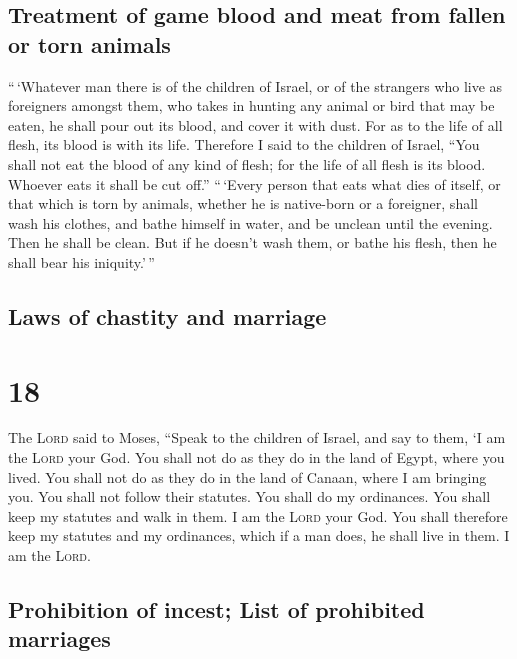 \hypertarget{treatment-of-game-blood-and-meat-from-fallen-or-torn-animals}{%
\subsection{Treatment of game blood and meat from fallen or torn
animals}\label{treatment-of-game-blood-and-meat-from-fallen-or-torn-animals}}

 ``\,`Whatever man there is of the children of Israel, or
of the strangers who live as foreigners amongst them, who takes in
hunting any animal or bird that may be eaten, he shall pour out its
blood, and cover it with dust.  For as to the life of all
flesh, its blood is with its life. Therefore I said to the children of
Israel, ``You shall not eat the blood of any kind of flesh; for the life
of all flesh is its blood. Whoever eats it shall be cut off.''
 ``\,`Every person that eats what dies of itself, or that
which is torn by animals, whether he is native-born or a foreigner,
shall wash his clothes, and bathe himself in water, and be unclean until
the evening. Then he shall be clean.  But if he doesn't
wash them, or bathe his flesh, then he shall bear his iniquity.'\,''

\hypertarget{laws-of-chastity-and-marriage}{%
\subsection{Laws of chastity and
marriage}\label{laws-of-chastity-and-marriage}}

\hypertarget{section-17}{%
\section{18}\label{section-17}}

 The \textsc{Lord} said to Moses,  ``Speak
to the children of Israel, and say to them, `I am the \textsc{Lord} your
God.  You shall not do as they do in the land of Egypt,
where you lived. You shall not do as they do in the land of Canaan,
where I am bringing you. You shall not follow their statutes.
 You shall do my ordinances. You shall keep my statutes
and walk in them. I am the \textsc{Lord} your God.  You
shall therefore keep my statutes and my ordinances, which if a man does,
he shall live in them. I am the \textsc{Lord}.

\hypertarget{prohibition-of-incest-list-of-prohibited-marriages}{%
\subsection{Prohibition of incest; List of prohibited
marriages}\label{prohibition-of-incest-list-of-prohibited-marriages}}

